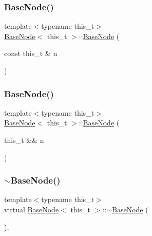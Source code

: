 \mbox{\label{class_base_node_a4bad5d46ee19af54c1385771bb6c8380}} 
\subsubsection{\texorpdfstring{Base\+Node()}{BaseNode()}\hspace{0.1cm}{\footnotesize\ttfamily [2/3]}}
{\footnotesize\ttfamily template$<$typename this\+\_\+t$>$ \\
\hyperlink{class_base_node}{Base\+Node}$<$ this\+\_\+t $>$\+::\hyperlink{class_base_node}{Base\+Node} (\begin{DoxyParamCaption}\item[{const this\+\_\+t \&}]{n }\end{DoxyParamCaption})\hspace{0.3cm}{\ttfamily [inline]}}

\mbox{\label{class_base_node_ab42ef3f5a20566523577925ab0c2a911}} 
\subsubsection{\texorpdfstring{Base\+Node()}{BaseNode()}\hspace{0.1cm}{\footnotesize\ttfamily [3/3]}}
{\footnotesize\ttfamily template$<$typename this\+\_\+t$>$ \\
\hyperlink{class_base_node}{Base\+Node}$<$ this\+\_\+t $>$\+::\hyperlink{class_base_node}{Base\+Node} (\begin{DoxyParamCaption}\item[{this\+\_\+t \&\&}]{n }\end{DoxyParamCaption})\hspace{0.3cm}{\ttfamily [inline]}}

\mbox{\label{class_base_node_a2a33248b0eb051d7672691a73a38ff12}} 
\subsubsection{\texorpdfstring{$\sim$\+Base\+Node()}{~BaseNode()}}
{\footnotesize\ttfamily template$<$typename this\+\_\+t$>$ \\
virtual \hyperlink{class_base_node}{Base\+Node}$<$ this\+\_\+t $>$\+::$\sim$\hyperlink{class_base_node}{Base\+Node} (\begin{DoxyParamCaption}{ }\end{DoxyParamCaption})\hspace{0.3cm}{\ttfamily [inline]}, {\ttfamily [virtual]}}



